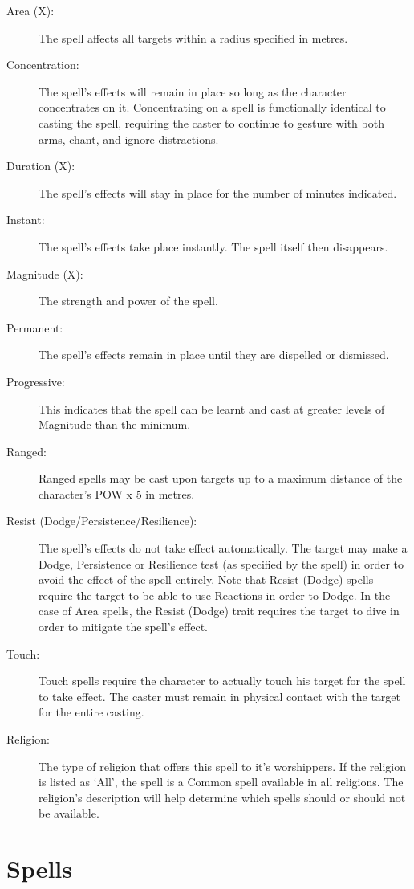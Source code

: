 \begin{description}
	\item[Area (X):] The spell affects all targets within a radius specified in metres.
	\item[Concentration:] The spell’s effects will remain in place so long as the character concentrates on it. Concentrating on a spell is functionally identical to casting the spell, requiring the caster to continue to gesture with both arms, chant, and ignore distractions.
	\item[Duration (X):] The spell’s effects will stay in place for the number of minutes indicated. 
	\item[Instant:] The spell’s effects take place instantly. The spell itself then disappears. 
	\item[Magnitude (X):] The strength and power of the spell.
	\item[Permanent:] The spell’s effects remain in place until they are dispelled or dismissed.
	\item[Progressive:] This indicates that the spell can be learnt and cast at greater levels of Magnitude than the minimum.
	\item[Ranged:] Ranged spells may be cast upon targets up to a maximum distance of the character’s POW x 5 in metres.
	\item[Resist (Dodge/Persistence/Resilience):] The spell’s effects do not take effect automatically. The target may make a Dodge, Persistence or Resilience test (as specified by the spell) in order to avoid the effect of the spell entirely. Note that Resist (Dodge) spells require the target to be able to use Reactions in order to Dodge. In the case of Area spells, the Resist (Dodge) trait requires the target to dive in order to mitigate the spell’s effect. 
	\item[Touch:] Touch spells require the character to actually touch his target for the spell to take effect. The caster must remain in physical contact with the target for the entire casting.
	\item[Religion:] The type of religion that offers this spell to it’s worshippers. If the religion is listed as ‘All’, the spell is a Common spell available in all religions. The religion’s description will help determine which spells should or should not be available. 
\end{description}

\section{Spells}

